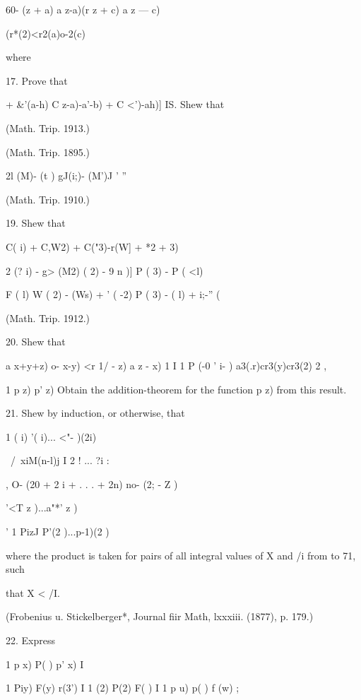 {60- (z + a) a z-a)(r z + c) a z — c) 



(r*(2)<r2(a)o-2(c) 



where 

17. Prove that 

+ \&'(a-h) C z-a)-a'-b) + C <')-ah)] 
IS. Shew that 



(Math. Trip. 1913.) 



(Math. Trip. 1895.) 



2l (M)- (t ) gJ(i;)- (M')J   '     ''  

(Math. Trip. 1910.) 

19. Shew that 

C( i) + C,W2) + C("3)-r(W] +  *2 +  3) 

2    (? i) - g> (M2)     ( 2) - 9  n )]  P ( 3) - P ( <l)  

F ( l) W ( 2) -   (Ws)  +  ' ( -2)  P ( 3) -   ( l)  + i;-'' (%

(Math. Trip. 1912.) 

20. Shew that 

a x+y+z) o-  x-y) <r  1/ - z) a  z - x)   1 I 1 P (-0  ' i- ) 
a3(.r)cr3(y)cr3(2) 2     ,    

1 p z) p' z) 
Obtain the addition-theorem for the function p  z) from this result. 

21. Shew by induction, or otherwise, that 

1  ( i)  '( i)... <"- )(2i) 



\ /\ xiM(n-l)j I 2 ! ... ?i : 



, O- (20 + 2 i + . . . + 2n) no- (2;  - Z ) 

'<T  z )...a"*' z ) 



' 1 PizJ P'(2 )...p-1)(2 ) 

where the product is taken for pairs of all integral values of X and /i from to 71, such 

that X < /I. 

(Frobenius u. Stickelberger*, Journal fiir Math, lxxxiii. (1877), p. 179.) 

22. Express 

1 p x) P( ) p' x) I 

1 Piy) F(y) r(3') I 
1  (2) P(2) F( ) I 
1 p u) p( ) f (w) ; 

}

